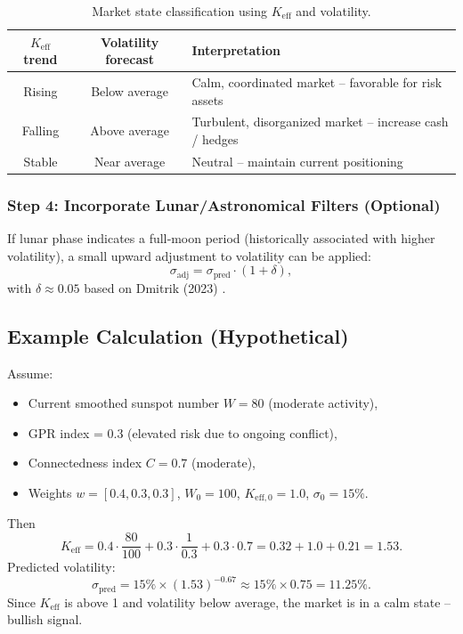 \documentclass[11pt,a4paper]{article}
\theoremstyle{remark}
\begin{document}
	\begin{table}[h]
		\centering
		\caption{Market state classification using \(K_{\mathrm{eff}}\) and volatility.}
		\label{tab:states}
		\begin{tabular}{ccl}
			\toprule
			\(K_{\mathrm{eff}}\) trend & Volatility forecast & Interpretation \\
			\midrule
			Rising & Below average & Calm, coordinated market – favorable for risk assets \\
			Falling & Above average & Turbulent, disorganized market – increase cash / hedges \\
			Stable & Near average & Neutral – maintain current positioning \\
			\bottomrule
		\end{tabular}
	\end{table}
	
	\subsubsection{Step 4: Incorporate Lunar/Astronomical Filters (Optional)}
	
	If lunar phase indicates a full‑moon period (historically associated with higher volatility), a small upward adjustment to volatility can be applied:
	\[
	\sigma_{\text{adj}} = \sigma_{\text{pred}} \cdot (1 + \delta),
	\]
	with \(\delta \approx 0.05\) based on Dmitrik (2023) \cite{Dmitrik2023}.
	
	\subsection{Example Calculation (Hypothetical)}
	
	Assume:
	\begin{itemize}
		\item Current smoothed sunspot number \(W = 80\) (moderate activity),
		\item GPR index = 0.3 (elevated risk due to ongoing conflict),
		\item Connectedness index \(C = 0.7\) (moderate),
		\item Weights \(w = [0.4, 0.3, 0.3]\), \(W_0=100\), \(K_{\mathrm{eff,0}}=1.0\), \(\sigma_0=15\%\).
	\end{itemize}
	Then
	\[
	K_{\mathrm{eff}} = 0.4\cdot\frac{80}{100} + 0.3\cdot\frac{1}{0.3} + 0.3\cdot0.7 = 0.32 + 1.0 + 0.21 = 1.53.
	\]
	Predicted volatility:
	\[
	\sigma_{\text{pred}} = 15\% \times (1.53)^{-0.67} \approx 15\% \times 0.75 = 11.25\%.
	\]
	Since \(K_{\mathrm{eff}}\) is above 1 and volatility below average, the market is in a calm state – bullish signal.
	
\end{document}
